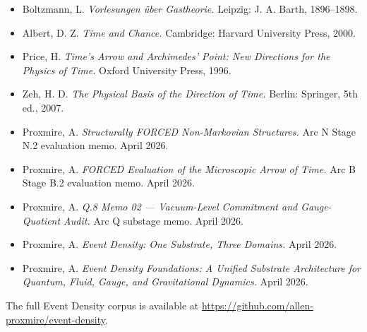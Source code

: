 \documentclass[11pt,a4paper]{article}
\begin{document}
\begin{itemize}[leftmargin=*,itemsep=2pt]
  \item Boltzmann, L. \emph{Vorlesungen \"uber Gastheorie.} Leipzig: J. A. Barth, 1896--1898.
  \item Albert, D. Z. \emph{Time and Chance.} Cambridge: Harvard University Press, 2000.
  \item Price, H. \emph{Time's Arrow and Archimedes' Point: New Directions for the Physics of Time.} Oxford University Press, 1996.
  \item Zeh, H. D. \emph{The Physical Basis of the Direction of Time.} Berlin: Springer, 5th ed., 2007.
  \item Proxmire, A. \emph{Structurally FORCED Non-Markovian Structures.} Arc N Stage N.2 evaluation memo. April 2026.
  \item Proxmire, A. \emph{FORCED Evaluation of the Microscopic Arrow of Time.} Arc B Stage B.2 evaluation memo. April 2026.
  \item Proxmire, A. \emph{Q.8 Memo 02 --- Vacuum-Level Commitment and Gauge-Quotient Audit.} Arc Q substage memo. April 2026.
  \item Proxmire, A. \emph{Event Density: One Substrate, Three Domains.} April 2026.
  \item Proxmire, A. \emph{Event Density Foundations: A Unified Substrate Architecture for Quantum, Fluid, Gauge, and Gravitational Dynamics.} April 2026.
\end{itemize}

The full Event Density corpus is available at \url{https://github.com/allen-proxmire/event-density}.
\end{document}
